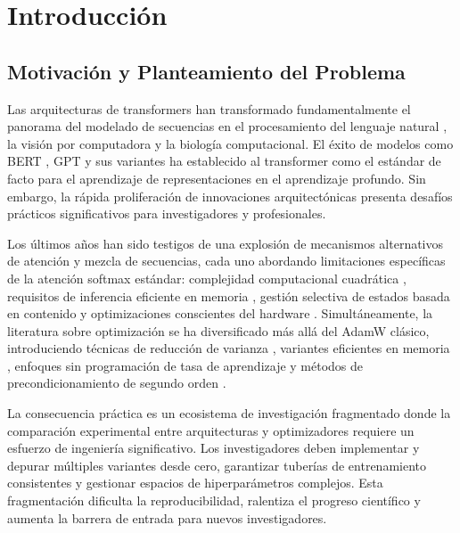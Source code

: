 \documentclass[11pt,a4paper]{article}
\begin{document}
\tableofcontents
\newpage

\section{Introducción}

\subsection{Motivación y Planteamiento del Problema}

Las arquitecturas de transformers han transformado fundamentalmente el panorama del modelado de secuencias en el procesamiento del lenguaje natural \citep{vaswani_attention_2017}, la visión por computadora y la biología computacional. El éxito de modelos como BERT \citep{devlin_bert_2019}, GPT y sus variantes ha establecido al transformer como el estándar de facto para el aprendizaje de representaciones en el aprendizaje profundo. Sin embargo, la rápida proliferación de innovaciones arquitectónicas presenta desafíos prácticos significativos para investigadores y profesionales.

Los últimos años han sido testigos de una explosión de mecanismos alternativos de atención y mezcla de secuencias, cada uno abordando limitaciones específicas de la atención softmax estándar: complejidad computacional cuadrática \citep{child_sparse_transformer_2019}, requisitos de inferencia eficiente en memoria \citep{sun_retentive_2023,gu_mamba_2023}, gestión selectiva de estados basada en contenido \citep{behrouz_titans_2025} y optimizaciones conscientes del hardware \citep{ramapuram_theory_2024}. Simultáneamente, la literatura sobre optimización se ha diversificado más allá del AdamW clásico, introduciendo técnicas de reducción de varianza \citep{xie_adan_2022,pagliardini_ademamix_2024,yuan_mars_2024}, variantes eficientes en memoria \citep{shazeer_adafactor_2018,zhao_galore_2024}, enfoques sin programación de tasa de aprendizaje \citep{defazio_road_2024} y métodos de precondicionamiento de segundo orden \citep{gupta_shampoo_2018,vyas_soap_2024}.

La consecuencia práctica es un ecosistema de investigación fragmentado donde la comparación experimental entre arquitecturas y optimizadores requiere un esfuerzo de ingeniería significativo. Los investigadores deben implementar y depurar múltiples variantes desde cero, garantizar tuberías de entrenamiento consistentes y gestionar espacios de hiperparámetros complejos. Esta fragmentación dificulta la reproducibilidad, ralentiza el progreso científico y aumenta la barrera de entrada para nuevos investigadores.
\end{document}
